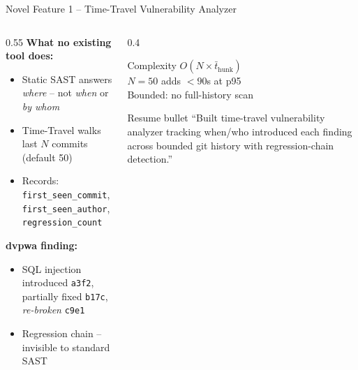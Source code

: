 \documentclass[aspectratio=169,12pt]{beamer}
\begin{document}
\begin{frame}{Novel Feature 1 -- Time-Travel Vulnerability Analyzer}
  \begin{columns}[T]
    \begin{column}{0.55\textwidth}
      \textbf{What no existing tool does:}
      \begin{itemize}
        \item Static SAST answers \emph{where} -- not \emph{when} or \emph{by whom}
        \item Time-Travel walks last $N$ commits (default 50)
        \item Records: \texttt{first\_seen\_commit}, \texttt{first\_seen\_author},
              \texttt{regression\_count}
      \end{itemize}
      \vspace{4pt}
      \textbf{dvpwa finding:}
      \begin{itemize}\small
        \item SQL injection introduced \texttt{a3f2}, partially fixed \texttt{b17c},
              \emph{re-broken} \texttt{c9e1}
        \item Regression chain -- invisible to standard SAST
      \end{itemize}
    \end{column}
    \begin{column}{0.4\textwidth}
      \begin{block}{Complexity}
        $O(N \times \bar{t}_{\text{hunk}})$\\
        $N=50$ adds $<90$s at p95\\
        Bounded: no full-history scan
      \end{block}
      \vspace{6pt}
      \begin{exampleblock}{Resume bullet}
        ``Built time-travel vulnerability analyzer tracking when/who introduced
        each finding across bounded git history with regression-chain detection.''
      \end{exampleblock}
    \end{column}
  \end{columns}
\end{frame}
\end{document}
